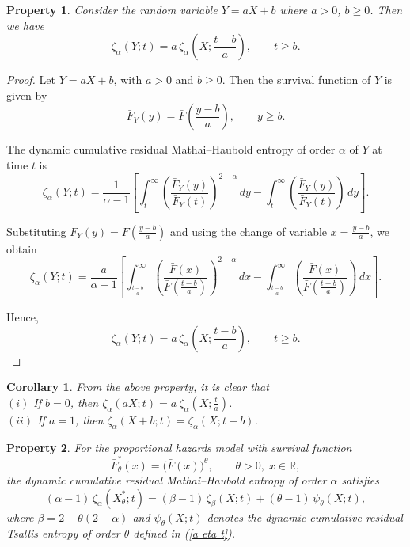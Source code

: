 \documentclass[11pt,reqno]{amsart}
\theoremstyle{tight}
\newtheorem{corollary}{Corollary}[section]
\newtheorem{property}{Property}[section]
\begin{document}
 \begin{property}
 Consider the random variable $Y=aX+b$ where $a>0$, $b\geq0$. Then we have
\[
\zeta_\alpha(Y;t)
= a\,\zeta_\alpha\!\left(X;\frac{t-b}{a}\right),
\qquad t\ge b.
\]
 \end{property}
    \begin{proof}
Let $Y=aX+b$, with $a>0$ and $b\geq 0$.
Then the survival function of $Y$ is given by
\[
\bar{F}_Y(y)=\bar{F}\!\left(\frac{y-b}{a}\right), \qquad y\ge b.
\]

The dynamic cumulative residual Mathai--Haubold entropy of order $\alpha$ of $Y$ at time $t$ is
\[
\zeta_\alpha(Y;t)
= \frac{1}{\alpha-1}
\left[
\int_t^\infty
\left(\frac{\bar{F}_Y(y)}{\bar{F}_Y(t)}\right)^{2-\alpha} \,dy
-
\int_t^\infty
\left(\frac{\bar{F}_Y(y)}{\bar{F}_Y(t)}\right) \,dy
\right].
\]

Substituting $\bar{F}_Y(y)=\bar{F}\!\left(\frac{y-b}{a}\right)$ and using the change of variable
$x=\frac{y-b}{a}$, we obtain
\[
\zeta_\alpha(Y;t)
= \frac{a}{\alpha-1}
\left[
\int_{\frac{t-b}{a}}^\infty
\left(\frac{\bar{F}(x)}{\bar{F}\!\left(\frac{t-b}{a}\right)}\right)^{2-\alpha} \,dx
-
\int_{\frac{t-b}{a}}^\infty
\left(\frac{\bar{F}(x)}{\bar{F}\!\left(\frac{t-b}{a}\right)}\right) \,dx
\right].
\]

Hence,
\[
\zeta_\alpha(Y;t)
= a\,\zeta_\alpha\!\left(X;\frac{t-b}{a}\right),
\qquad t\ge b.
\]
\end{proof}
\begin{corollary}
 From the above property, it is clear that\\
$(i)$ If $b=0$, then $\zeta_\alpha(aX;t)=a~\zeta_\alpha\left(X;\frac{t}
{a}\right)$.\\
$(ii)$ If $a=1$, then $\zeta_\alpha(X+b;t)=\zeta_\alpha(X;t-b)$.
 \end{corollary}
 \begin{property}
For the proportional hazards model with survival function
\[
\bar{F}_\theta^*(x) = \bigl(\bar{F}(x)\bigr)^\theta, \qquad \theta>0,\; x\in\mathbb{R},
\]
the dynamic cumulative residual Mathai--Haubold entropy of order $\alpha$ satisfies
\begin{equation}\label{aPH}
(\alpha-1)\,\zeta_{\alpha}(X_\theta^{*};t)
= (\beta-1)\,\zeta_{\beta}(X;t)
+ (\theta-1)\,\psi_{\theta}(X;t),
\end{equation}
where $\beta = 2-\theta(2-\alpha)$ and $\psi_{\theta}(X;t)$ denotes the dynamic cumulative
residual Tsallis entropy of order $\theta$ defined in (\ref{a eta t}).
\end{property}
\end{document}
